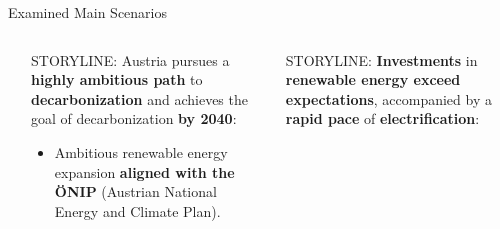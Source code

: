 \documentclass[aspectratio=169]{beamer}
\begin{document}
\begin{frame}{Examined Main Scenarios}
\begin{columns}
\begin{column}{0.32\textwidth}
\begin{coloredblock}
\begin{minipage}[t][2cm]{0.9\textwidth}
\begin{itemize}
                    \end{itemize}
                \end{minipage}
                \begin{minipage}[t][3.7cm]{0.9\textwidth} 
                    \scriptsize ~
                \end{minipage}
            \end{coloredblock}
        \end{column}
        \begin{column}{0.32\textwidth}
            \begin{coloredblock}
                \begin{minipage}[t][3.5cm]{0.9\textwidth} 
                    \scriptsize STORYLINE: Austria pursues a \textbf{highly ambitious path} to \textbf{decarbonization} and achieves the goal of decarbonization \textbf{by 2040}:
                \end{minipage}
                \begin{minipage}[t][2cm]{0.9\textwidth}
                    \begin{itemize}
                        \item \scriptsize Ambitious renewable energy expansion \textbf{aligned with the ÖNIP} (Austrian National Energy and Climate Plan).
                    \end{itemize}
                \end{minipage}
                \begin{minipage}[t][3.7cm]{0.9\textwidth} 
                    \scriptsize ~
                \end{minipage}
            \end{coloredblock}
        \end{column}
        \begin{column}{0.32\textwidth}
            \begin{coloredblock}
                \begin{minipage}[t][3.5cm]{0.9\textwidth} 
                    \scriptsize STORYLINE: \textbf{Investments} in \textbf{renewable energy exceed expectations}, accompanied by a \textbf{rapid pace} of \textbf{electrification}:
                \end{minipage}
                \begin{minipage}[t][2cm]{0.9\textwidth}

\end{minipage}
\end{coloredblock}
\end{column}
\end{columns}
\end{frame}
\end{document}
